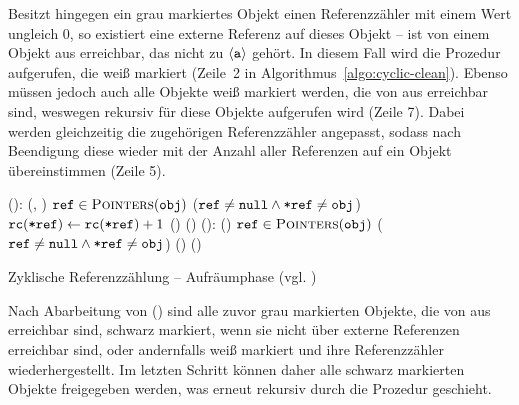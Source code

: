 Besitzt hingegen ein grau markiertes Objekt  einen Referenzzähler mit einem Wert ungleich $0$, so existiert eine externe Referenz auf dieses Objekt --  ist von einem Objekt aus erreichbar, das nicht zu $\left\langle\texttt{a}\right\rangle$ gehört.
In diesem Fall wird die Prozedur  aufgerufen, die  weiß markiert (Zeile~2 in Algorithmus~\ref{algo:cyclic-clean}).
Ebenso müssen jedoch auch alle Objekte weiß markiert werden, die von  aus erreichbar sind, 
weswegen  rekursiv für diese Objekte aufgerufen wird (Zeile 7).
Dabei werden gleichzeitig die zugehörigen Referenzzähler angepasst, sodass nach Beendigung diese wieder mit der Anzahl aller Referenzen auf ein Objekt übereinstimmen (Zeile 5).

\begin{algorithm}[h]
\begin{algorithmic}[1]
	\State {}():
	\State \quad {}(, )		
	\State \quad \FOREACH $\texttt{ref} \in \textsc{Pointers}(\texttt{obj})$
	\State \quad \quad \IF ($\texttt{ref} \neq \texttt{null} \wedge \texttt{*ref} \neq \texttt{obj}$)
	\State \quad \quad \quad $\texttt{rc}(\texttt{*ref}) \gets \texttt{rc}(\texttt{*ref})+1$ 
	\State \quad \quad \quad \IF {}()
	\State \quad \quad \quad \quad {}()
	\Statex
	\State {}():
	\State \quad \IF {}()	
	\State \quad \quad \FOREACH $\texttt{ref} \in \textsc{Pointers}(\texttt{obj})$
	\State \quad \quad \quad \IF ($\texttt{ref} \neq \texttt{null} \wedge \texttt{*ref} \neq \texttt{obj}$)
	\State \quad \quad \quad \quad {}()
	\State \quad \quad {}()
\end{algorithmic}
\caption[Zyklische Referenzzählung -- Aufräumphase]{Zyklische Referenzzählung -- Aufräumphase (vgl. \cite[S. 33]{martinez1990})}
\label{algo:cyclic-clean}
\end{algorithm}

Nach Abarbeitung von () sind alle zuvor grau markierten Objekte, die von  aus erreichbar sind, schwarz markiert, wenn sie nicht über externe Referenzen erreichbar sind, oder andernfalls weiß markiert und ihre Referenzzähler wiederhergestellt.
Im letzten Schritt können daher alle schwarz markierten Objekte freigegeben werden, was erneut rekursiv durch die Prozedur  geschieht.


